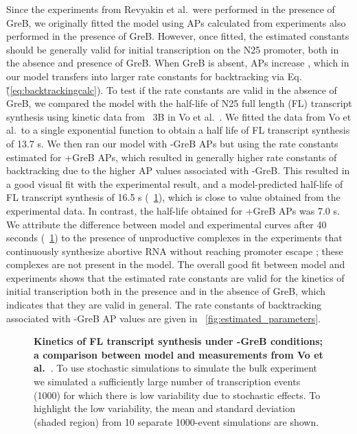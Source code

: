 Since the experiments from Revyakin et al.\ were performed in the presence of
GreB, we originally fitted the model using APs calculated from experiments
also performed in the presence of GreB. However, once fitted, the estimated
constants should be generally valid for initial transcription on the N25
promoter, both in the absence and presence of GreB. When GreB is absent, APs
increase \cite{hsu_initial_2006}, which in our model transfers into larger
rate constants for backtracking via Eq.\~(\ref{eq:backtrackingcalc}). To test
if the rate constants are valid in the absence of GreB, we compared the model
with the half-life of N25 full length (FL) transcript synthesis using kinetic
data from \FIG~3B in Vo et al.\ \cite{vo_vitro_2003-1}.  We fitted the data
from Vo et al.\ to a single exponential function to obtain a half life of FL
transcript synthesis of 13.7 s. We then ran our model with -GreB APs but using
the rate constants estimated for +GreB APs, which resulted in generally
higher rate constants of backtracking due to the higher AP values associated
with -GreB. This resulted in a good visual fit with the experimental result,
and a model-predicted half-life of FL transcript synthesis of 16.5 s
(\FIG~\ref{fig:vo_comparison}), which is close to value obtained from the
experimental data. In contrast, the half-life obtained for +GreB APs was 7.0
s. We attribute the difference between model and experimental curves after 40
seconds (\FIG~\ref{fig:vo_comparison}) to the presence of unproductive
complexes in the experiments that continuously synthesize abortive RNA without
reaching promoter escape \cite{vo_vitro_2003-1}; these complexes are not
present in the model. The overall good fit between model and experiments shows
that the estimated rate constants are valid for the kinetics of initial
transcription both in the presence and in the absence of GreB, which indicates
that they are valid in general. The rate constants of backtracking associated
with -GreB AP values are given in \FIG~\ref{fig:estimated_parameters}.

\begin{figure}[h]
    \caption{ {\bf Kinetics of FL transcript synthesis under -GreB conditions;
        a comparison between model and measurements from Vo
      et al.~\cite{vo_vitro_2003-1}}. To use stochastic simulations to
      simulate the bulk experiment we simulated a sufficiently large number of
      transcription events (1000) for which there is low variability due to
      stochastic effects. To highlight the low variability, the mean and
      standard deviation (shaded region) from 10 separate 1000-event
      simulations are shown.}
\label{fig:vo_comparison}
\end{figure}


